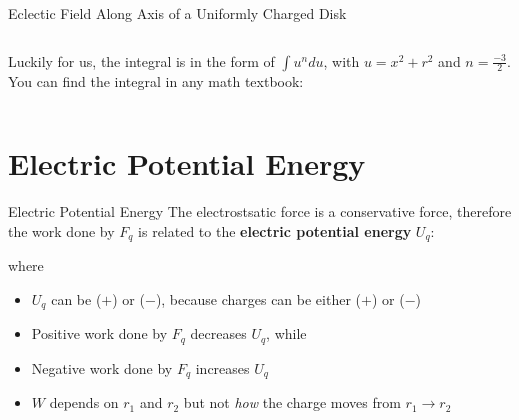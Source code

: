 \documentclass[12pt,aspectratio=169]{beamer}
\begin{document}
\begin{frame}{Eclectic Field Along Axis of a Uniformly Charged Disk}
  \begin{columns}
    
    Luckily for us, the integral is in the form of $\int u^ndu$,
    with $u=x^2+r^2$ and $n=\frac{-3}2$. You can find the integral in any math
    textbook:

  \end{columns}
\end{frame}



\section{Electric Potential Energy}

\begin{frame}{Electric Potential Energy}
  The electrostsatic force is a conservative force, therefore the work done
  by $F_q$ is related to the \textbf{electric potential energy} $U_q$:
  

  where
    
  \begin{itemize}
  \item $U_q$ can be ($+$) or ($-$), because charges can be either ($+$) or
    ($-$)
  \item Positive work done by $F_q$ decreases $U_q$, while
  \item Negative work done by $F_q$ increases $U_q$
  \item $W$ depends on $r_1$ and $r_2$ but not \emph{how} the charge moves from
    $r_1\rightarrow r_2$
  \end{itemize}
\end{frame}
\end{document}
